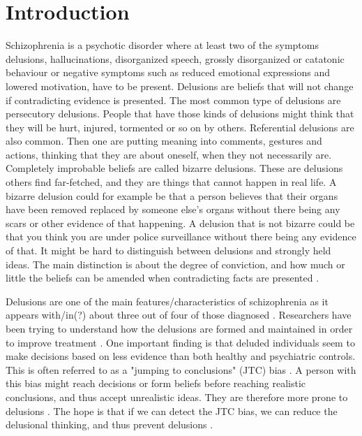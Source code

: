 \newpage
\section{Introduction}
Schizophrenia is a psychotic disorder where at least two of the symptoms delusions, hallucinations, disorganized speech, grossly disorganized or catatonic behaviour or negative symptoms such as reduced emotional expressions and lowered motivation, have to be present. 
Delusions are beliefs that will not change if contradicting evidence is presented. The most common type of delusions are persecutory delusions. People that have those kinds of delusions might think that they will be hurt, injured, tormented or so on by others. Referential delusions are also common. Then one are putting meaning into comments, gestures and actions, thinking that they are about oneself, when they not necessarily are. Completely improbable beliefs are called bizarre delusions. These are delusions others find far-fetched, and they are things that cannot happen in real life. A bizarre delusion could for example be that a person believes that their organs have been removed replaced by someone else's organs without there being any scars or other evidence of that happening. A delusion that is not bizarre could be that you think you are under police surveillance without there being any evidence of that. It might be hard to distinguish between delusions and strongly held ideas. The main distinction is about the degree of conviction, and how much or little the beliefs can be amended when contradicting facts are presented \citep{dsm-5}. 


Delusions are one of the main features/characteristics of schizophrenia as it appears with/in(?) about three out of four of those diagnosed \citep{garety2011}. Researchers have been trying to understand how the delusions are formed and maintained in order to improve treatment \citep{dudley_meta_2016}. One important finding is that deluded individuals seem to make decisions based on less evidence than both healthy and psychiatric controls. This is often referred to as a "jumping to conclusions" (JTC) bias \citep{dudley_meta_2016}. A person with this bias might reach decisions or form beliefs before reaching realistic conclusions, and thus accept unrealistic ideas. They are therefore more prone to delusions \citep{dudley_meta_2016}. The hope is that if we can detect the JTC bias, we can reduce the delusional thinking, and thus prevent delusions \citep{dudley_meta_2016}.

